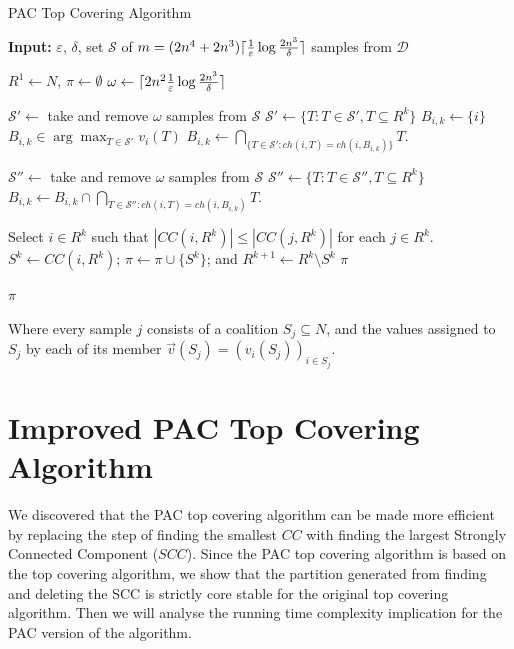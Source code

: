 \documentclass[letterpaper]{article} %
\DeclarePairedDelimiter\ceil{\lceil}{\rceil}
\renewcommand{\cal}[1]{\mathcal{#1}}
\newcommand{\eps}{\varepsilon}
\newcommand{\ch}{\mathit{ch}}
\newcommand{\samples}{\omega}
\theoremstyle{definition}
\begin{document}
\begin{algorithm}[htb]
  \caption{PAC Top Covering Algorithm}
  \label{alg:pac_top_covering}
  \textbf{Input:} $\eps$, $\delta$, set $\cal S$ of $m = (2n^4 + 2n^3)\ceil{\frac{1}{\eps}\log\frac{2n^3}{\delta}}$ samples from $\cal D$
  \begin{algorithmic}[1]

  \State $R^1 \gets N$, $\pi \gets \emptyset$
  \State $\samples \gets \ceil{2n^2 \frac{1}{\eps}\log\frac{2n^3}{\delta}}$

    \State $\cal S' \gets$ take and remove $\samples$ samples from $\cal S$
    \State $\cal S' \gets \{T: T \in \cal S', T \subseteq R^k\}$
      \If{$i \notin \bigcup_{X \in \cal S'} X$}
        \State$B_{i,k} \gets \{i\}$
      \Else
        \State $B_{i,k} \in \arg\max_{T \in \cal S'}{v_i(T)}$
        \State $B_{i,k} \gets \underset{\{T \in \cal S' : \ch(i,T) = \ch(i,B_{i,k})\}}{\bigcap} T$.
      \EndIf
    \EndFor

      \State $\cal S'' \gets$ take and remove $\samples$ samples from $\cal S$
      \State $\cal S'' \gets \{T: T \in \cal S'', T \subseteq R^k\}$
        \State $B_{i,k} \gets B_{i,k} \cap \underset{T \in \cal S'' : \ch(i,T) = \ch(i,B_{i,k})}{\bigcap} T$.
      \EndFor
    \EndFor

    \State Select $i\in R^k$ such that $|CC(i,R^k)| \leq |CC(j,R^k)|$ for each $j\in R^k$.
    \State $S^k\leftarrow  CC(i,R^k)$; $\pi \leftarrow  \pi \cup \lbrace S^k \rbrace$;  and $R^{k+1} \leftarrow  R^k \setminus S^k$
      \State \Return $\pi$
    \EndIf
  \EndFor

  \State \Return $\pi$
 \end{algorithmic}
\end{algorithm}

Where every sample $j$ consists of a coalition $S_j \subseteq N$, and the values assigned to $S_j$ by each of its member $\vec{v}(S_j) = (v_i(S_j))_{i \in S_j}$.

\section{Improved PAC Top Covering Algorithm}
We discovered that the PAC top covering algorithm can be made more efficient by replacing the step of finding the smallest $CC$ with finding the largest Strongly Connected Component ($SCC$). 
Since the PAC top covering algorithm is based on the top covering algorithm, we show that the partition generated from finding and deleting the SCC is strictly core stable for the original top covering algorithm. Then we will analyse the running time complexity implication for the PAC version of the algorithm.
\end{document}
